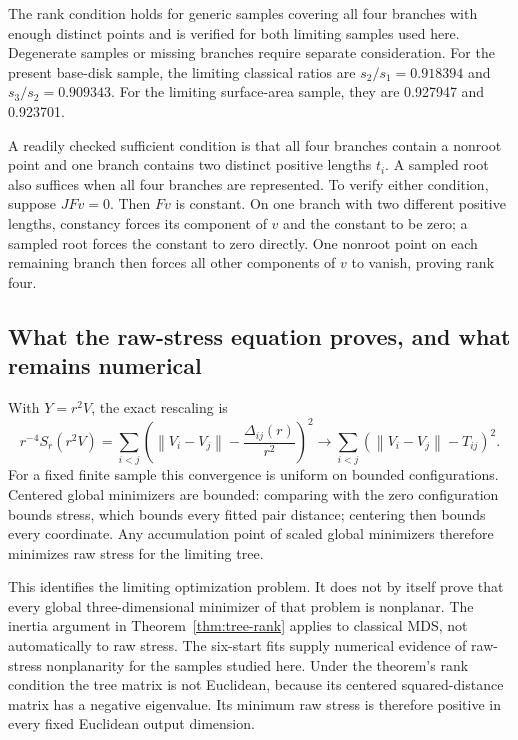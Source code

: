 \documentclass[11pt]{article}
\theoremstyle{remark}\newtheorem{remark}[proposition]{Remark}
\newcommand{\norm}[1]{\left\lVert#1\right\rVert}
\begin{document}
The rank condition holds for generic samples covering all four branches with
enough distinct points and is verified for both limiting samples used here.
Degenerate samples or missing branches require separate consideration. For
the present base-disk sample, the limiting classical ratios are
$s_2/s_1=0.918394$ and $s_3/s_2=0.909343$. For the limiting surface-area sample,
they are 0.927947 and 0.923701.

A readily checked sufficient condition is that all four branches contain a
nonroot point and one branch contains two distinct positive lengths $t_i$.
A sampled root also suffices when all four branches are represented.
To verify either condition, suppose $JFv=0$. Then $Fv$ is constant. On one
branch with two different positive lengths, constancy forces its component
of $v$ and the constant to be zero; a sampled root forces the constant to zero
directly. One nonroot point on each remaining branch then forces all other
components of $v$ to vanish, proving rank four.

\subsection{What the raw-stress equation proves, and what remains numerical}
With $Y=r^2V$, the exact rescaling is
\begin{equation}\label{eq:tree-stress}
 r^{-4}S_r(r^2V)=\sum_{i<j}
 \left(\norm{V_i-V_j}-\frac{\Delta_{ij}(r)}{r^2}\right)^2
 \longrightarrow\sum_{i<j}(\norm{V_i-V_j}-T_{ij})^2.
\end{equation}
For a fixed finite sample this convergence is uniform on bounded
configurations. Centered global minimizers are bounded: comparing with the
zero configuration bounds stress, which bounds every fitted pair distance;
centering then bounds every coordinate. Any accumulation point of scaled
global minimizers therefore minimizes raw stress for the limiting tree.

This identifies the limiting optimization problem. It does not by itself
prove that every global three-dimensional minimizer of that problem is
nonplanar. The inertia argument in Theorem~\ref{thm:tree-rank} applies to
classical MDS, not automatically to raw stress. The six-start fits supply
numerical evidence of raw-stress nonplanarity for the samples studied here.
Under the theorem's rank condition the tree matrix is not Euclidean, because
its centered squared-distance matrix has a negative eigenvalue. Its minimum
raw stress is therefore positive in every fixed Euclidean output dimension.
\end{document}
